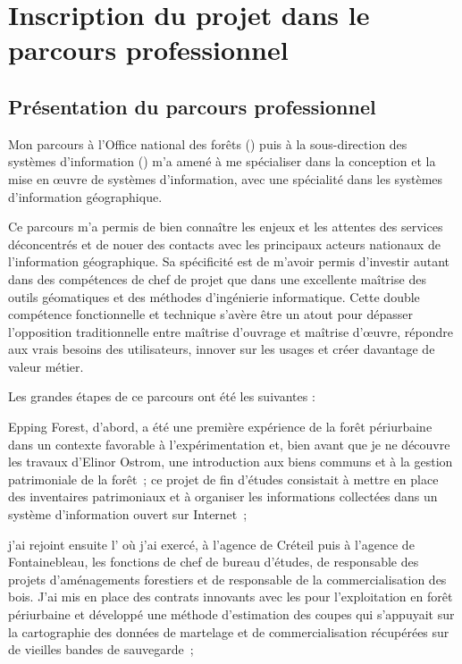 \section[origin]
{Inscription du projet dans le parcours professionnel}

\subsection
{Présentation du parcours professionnel}

Mon parcours à l'Office national des forêts ({\ONF})
puis à la sous-direction des systèmes d'information ({\SDSI})
m'a amené à me spécialiser dans la conception et la mise en œuvre
de systèmes d'information, avec une spécialité dans les systèmes d'information géographique.

Ce parcours m'a permis de bien connaître les enjeux et les attentes
des services déconcentrés et de nouer des contacts avec les principaux
acteurs nationaux de l'information géographique.
Sa spécificité est de m'avoir permis d'investir autant dans
des compétences de chef de projet que dans une excellente maîtrise
des outils géomatiques et des méthodes d'ingénierie informatique.
Cette double compétence fonctionnelle et technique
s'avère être un atout pour dépasser l'opposition traditionnelle
entre maîtrise d'ouvrage et maîtrise d’œuvre,
répondre aux vrais besoins des utilisateurs, innover sur les usages
et créer davantage de valeur métier.

Les grandes étapes de ce parcours ont été les suivantes :

\startitemize[n]

\item Epping Forest, d'abord,
      a été une première expérience de la forêt
      périurbaine dans un contexte favorable à l'expérimentation
      et, bien avant que je ne découvre les travaux d'Elinor Ostrom,
      une introduction aux biens communs et à la gestion patrimoniale de la forêt~;
      ce projet de fin d'études consistait à mettre en place des inventaires patrimoniaux
      et à organiser les informations collectées dans un système d'information
      ouvert sur Internet~;

\item j'ai rejoint ensuite l'{\ONF}
      où j'ai exercé, à l'agence de Créteil puis à l'agence de Fontainebleau,
      les fonctions de chef de bureau d'études, de responsable
      des projets d'aménagements forestiers et de responsable
      de la commercialisation des bois. J'ai mis en place
      des contrats innovants avec les {\ETF} pour l'exploitation
      en forêt périurbaine et développé une méthode d'estimation
      des coupes qui s'appuyait sur la cartographie
      des données de martelage et de commercialisation
      récupérées sur de vieilles bandes de sauvegarde~;

